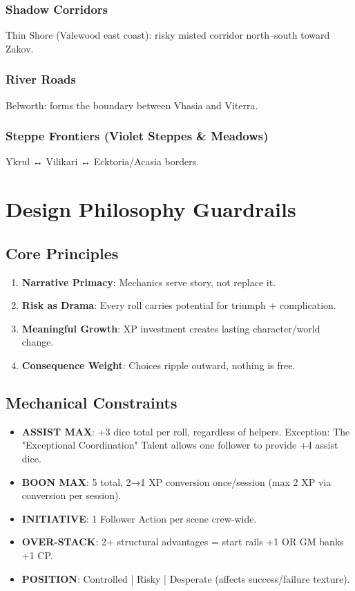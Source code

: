 \documentclass[11pt]{article}
\begin{document}
\subsubsection{Shadow Corridors}
Thin Shore (Valewood east coast): risky misted corridor north–south toward Zakov.

\subsubsection{River Roads}
Belworth: forms the boundary between Vhasia and Viterra.

\subsubsection{Steppe Frontiers (Violet Steppes \& Meadows)}
Ykrul ↔ Vilikari ↔ Ecktoria/Acasia borders.

\section{Design Philosophy Guardrails}

\subsection{Core Principles}
\begin{enumerate}
    \item \textbf{Narrative Primacy}: Mechanics serve story, not replace it.
    \item \textbf{Risk as Drama}: Every roll carries potential for triumph + complication.
    \item \textbf{Meaningful Growth}: XP investment creates lasting character/world change.
    \item \textbf{Consequence Weight}: Choices ripple outward, nothing is free.
\end{enumerate}

\subsection{Mechanical Constraints}
\begin{itemize}
    \item \textbf{ASSIST MAX}: +3 dice total per roll, regardless of helpers. Exception: The "Exceptional Coordination" Talent allows one follower to provide +4 assist dice.
    \item \textbf{BOON MAX}: 5 total, 2→1 XP conversion once/session (max 2 XP via conversion per session).
    \item \textbf{INITIATIVE}: 1 Follower Action per scene crew-wide.
    \item \textbf{OVER-STACK}: 2+ structural advantages = start rails +1 OR GM banks +1 CP.
    \item \textbf{POSITION}: Controlled | Risky | Desperate (affects success/failure texture).
\end{itemize}
\end{document}
